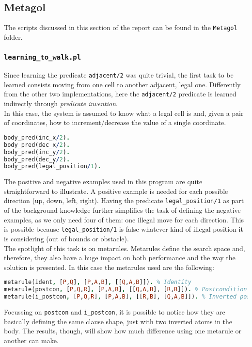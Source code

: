 \subsection{Metagol}
The scripts discussed in this section of the report can be found in the \texttt{Metagol} folder.\\


\subsubsection{\texttt{learning\_to\_walk.pl}}
Since learning the predicate \texttt{adjacent/2} was quite trivial, the first task to be learned
consists moving from one cell to another adjacent, legal
one. Differently from the other two implementations, here the \texttt{adjacent/2} predicate is learned
indirectly through \emph{predicate invention}.\\
In this case, the system is assumed to know what a legal cell is and, given a pair of coordinates, how
to increment/decrease the value of a single coordinate.
\begin{lstlisting}[language=Prolog, caption=Background Knowledge to walk, belowcaptionskip=1cm]
body_pred(inc_x/2).
body_pred(dec_x/2).
body_pred(inc_y/2).
body_pred(dec_y/2).
body_pred(legal_position/1).   
\end{lstlisting}
The positive and negative examples used in this program are quite straightforward to illustrate. A positive example
is needed for each possible direction (up, down, left, right). Having the predicate \texttt{legal\_position/1} as part 
of the background knowledge further simplifies the task of defining the negative examples, as we only need four of them:
one illegal move for each direction. This is possible because \texttt{legal\_position/1} is false whatever kind of illegal
position it is considering (out of bounds or obstacle).\\


The spotlight of this task is on metarules. Metarules define the search space and, therefore, they also have
a huge impact on both performance and the way the solution is presented. In this case the metarules used are
the following:
\begin{lstlisting}[language=Prolog, caption=Metarules in \texttt{learning\_to\_walk.pl}, belowcaptionskip=1cm]
metarule(ident, [P,Q], [P,A,B], [[Q,A,B]]). % Identity
metarule(postcon, [P,Q,R], [P,A,B], [[Q,A,B], [R,B]]). % Postcondition
metarule(i_postcon, [P,Q,R], [P,A,B], [[R,B], [Q,A,B]]). % Inverted postcondition  
\end{lstlisting}
Focussing on \texttt{postcon} and \texttt{i\_postcon}, it is possible to notice how they are basically defining
the same clause shape, just with two inverted atoms in the body. The results, though, will show how much difference
using one metarule or another can make.

